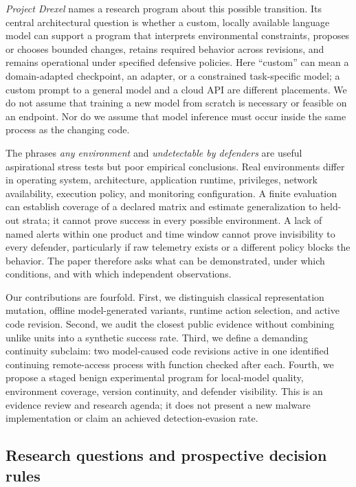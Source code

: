 \documentclass[11pt,letterpaper]{article}
\begin{document}
\emph{Project Drexel} names a research program about this possible transition. Its central architectural question is whether a custom, locally available language model can support a program that interprets environmental constraints, proposes or chooses bounded changes, retains required behavior across revisions, and remains operational under specified defensive policies. Here ``custom'' can mean a domain-adapted checkpoint, an adapter, or a constrained task-specific model; a custom prompt to a general model and a cloud API are different placements. We do not assume that training a new model from scratch is necessary or feasible on an endpoint. Nor do we assume that model inference must occur inside the same process as the changing code.

The phrases \emph{any environment} and \emph{undetectable by defenders} are useful aspirational stress tests but poor empirical conclusions. Real environments differ in operating system, architecture, application runtime, privileges, network availability, execution policy, and monitoring configuration. A finite evaluation can establish coverage of a declared matrix and estimate generalization to held-out strata; it cannot prove success in every possible environment. A lack of named alerts within one product and time window cannot prove invisibility to every defender, particularly if raw telemetry exists or a different policy blocks the behavior. The paper therefore asks what can be demonstrated, under which conditions, and with which independent observations.

Our contributions are fourfold. First, we distinguish classical representation mutation, offline model-generated variants, runtime action selection, and active code revision. Second, we audit the closest public evidence without combining unlike units into a synthetic success rate. Third, we define a demanding continuity subclaim: two model-caused code revisions active in one identified continuing remote-access process with function checked after each. Fourth, we propose a staged benign experimental program for local-model quality, environment coverage, version continuity, and defender visibility. This is an evidence review and research agenda; it does not present a new malware implementation or claim an achieved detection-evasion rate.

\subsection{Research questions and prospective decision rules}
\end{document}

